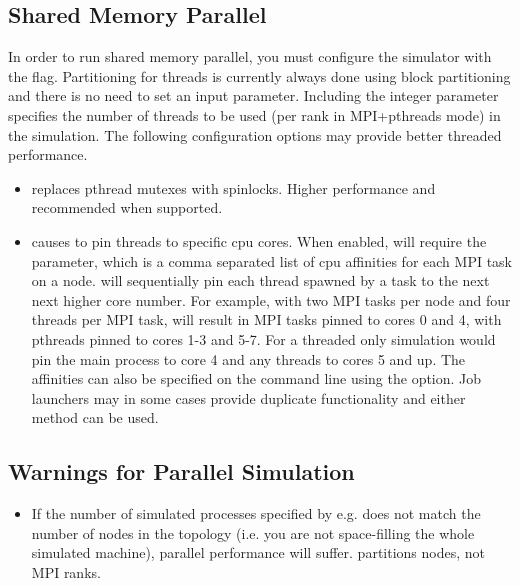 \subsection{Shared Memory Parallel}
\label{subsec:parallelopt}
In order to run shared memory parallel, you must configure the simulator with the  flag.
Partitioning for threads is currently always done using block partitioning and there is no need to set an input parameter.
Including the integer parameter  specifies the number of threads to be used (per rank in MPI+pthreads mode) in the simulation.
The following configuration options may provide better threaded performance.
\begin{itemize}
\item{} replaces pthread mutexes with spinlocks.  Higher performance and recommended when supported.
\item{} causes \sstmacro to pin threads to specific cpu cores.  When enabled, \sstmacro will require the
 parameter, which is a comma separated list of cpu affinities for each MPI task on a node.  \sstmacro will sequentially
pin each thread spawned by a task to the next next higher core number.  For example, with two MPI tasks per node and four threads per MPI task,
 will result in MPI tasks pinned to cores 0 and 4, with pthreads pinned to cores 1-3 and 5-7.
For a threaded only simulation  would pin the main process to core 4 and any threads to cores 5 and up.
The affinities can also be specified on the command line using the  option.
Job launchers may in some cases provide duplicate functionality and either method can be used.
\end{itemize}

\subsection{Warnings for Parallel Simulation}
\label{subsec:parallelwarn}
\begin{itemize}
\item If the number of simulated processes specified by e.g.  does not match the number of nodes in the topology (i.e. you are not space-filling the whole simulated machine), parallel performance will suffer. \sstmacro partitions nodes, not MPI ranks.
\end{itemize}

